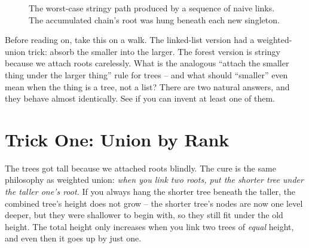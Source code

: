 \begin{figure}[htbp]
\centering
{}
\caption{The worst-case stringy path produced by a sequence of naive links. The accumulated chain's root was hung beneath each new singleton.}
\label{fig:naive-stringy-path}
\end{figure}


\begin{walkbox}
Before reading on, take this on a walk. The linked-list version had a
weighted-union trick: absorb the smaller into the larger. The forest version is
stringy because we attach roots carelessly. What is the analogous ``attach the
smaller thing under the larger thing'' rule for trees -- and what should
``smaller'' even mean when the thing is a tree, not a list? There are two
natural answers, and they behave almost identically. See if you can invent at
least one of them.
\end{walkbox}

\section{Trick One: Union by Rank}
\label{ch19:rank}

The trees got tall because we attached roots blindly. The cure is the same
philosophy as weighted union: \emph{when you link two roots, put the shorter
tree under the taller one's root.} If you always hang the shorter tree beneath
the taller, the combined tree's height does not grow -- the shorter tree's
nodes are now one level deeper, but they were shallower to begin with, so they
still fit under the old height. The total height only increases when you link
two trees of \emph{equal} height, and even then it goes up by just one.

